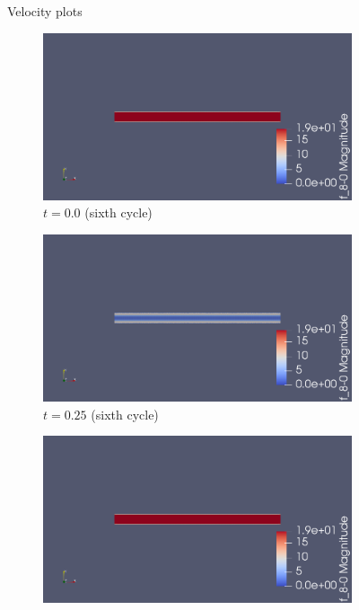 \documentclass{article}
\begin{document}
\begin{figure}[ht] 
\centering Velocity plots
  \begin{subfigure}[b]{0.5\linewidth}      
    \centering    
    \includegraphics[width=1\linewidth]{velocity_time_0.png} 
    \caption{$t=0.0$ (sixth cycle)} 
    \label{fig7:a} 
    \vspace{4ex}
  \end{subfigure}%
  \begin{subfigure}[b]{0.5\linewidth}
    \centering
    \includegraphics[width=1\linewidth]{velocity_time_025.png} 
    \caption{$t=0.25$ (sixth cycle)} 
    \label{fig7:b} 
    \vspace{4ex}
    \end{subfigure} 
  \begin{subfigure}[b]{0.5\linewidth}
    \centering
    \includegraphics[width=1\linewidth]{velocity_time_050.png} 

\end{subfigure}
\end{figure}
\end{document}
